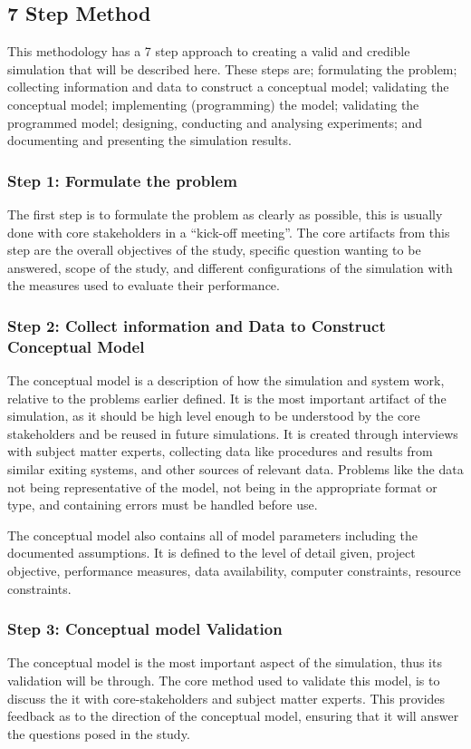 \subsection{7 Step Method}
This methodology has a 7 step approach to creating a valid and credible simulation that will be described here.
These steps are; formulating the problem; collecting information and data to construct a conceptual model; validating the conceptual model;
implementing (programming) the model; validating the programmed model; designing, conducting and analysing experiments; and documenting and presenting the simulation results.

\subsubsection{Step 1: Formulate the problem}
The first step is to formulate the problem as clearly as possible, this is usually done with core stakeholders in a ``kick-off meeting''.
The core artifacts from this step are the overall objectives of the study, specific question wanting to be answered, scope of the study,
 and different configurations of the simulation with the measures used to evaluate their performance. 

\subsubsection{Step 2: Collect information and Data to Construct Conceptual Model}
The conceptual model is a description of how the simulation and system work, relative to the problems earlier defined.
It is the most important artifact of the simulation, as it should be high level enough to be understood by the core stakeholders
and be reused in future simulations.
It is created through interviews with subject matter experts, collecting data like procedures and results from similar exiting systems, and other sources of relevant data.
Problems like the data not being representative of the model, not being in the appropriate format or type, and containing errors must be handled before use.

The conceptual model also contains all of model parameters including the documented assumptions. 
It is defined to the level of detail given, project objective, performance measures, data availability, computer constraints, resource constraints.

\subsubsection{Step 3: Conceptual model Validation}
The conceptual model is the most important aspect of the simulation, thus its validation will be through.
The core method used to validate this model, is to discuss the it with core-stakeholders and subject matter experts.
This provides feedback as to the direction of the conceptual model, ensuring that it will answer the questions posed in the study.

